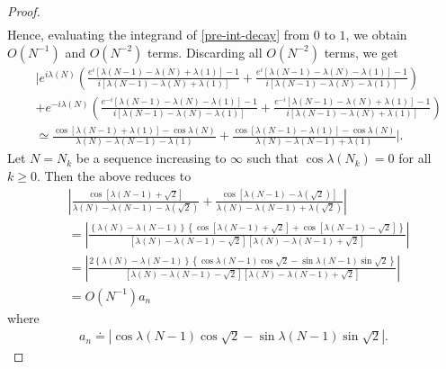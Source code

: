 \documentclass[12pt,reqno]{amsart}
\numberwithin{equation}{section}  %
\begin{document}
\begin{proof}
\begin{equation*}
\begin{split}
\end{split}
\end{equation*}
%
%
Hence, evaluating the integrand of \eqref{pre-int-decay} from $0$ to $1$, we obtain $O(N^{-1})$ and $O(N^{-2})$ terms. Discarding all $O(N^{-2})$ terms, we get
%
%
\begin{equation*}
\begin{split}
  & | e^{i \lambda(N)}\left( \frac{e^{i}[\lambda(N-1) - \lambda(N) + \lambda(1)] - 1}{i[\lambda(N-1) - \lambda(N) + \lambda(1)]} + 
  \frac{e^{i}[\lambda(N-1) - \lambda(N) - \lambda(1)] - 1}{i[\lambda(N-1) - \lambda(N) - \lambda(1)]} \right)
  \\
  & + e^{-i \lambda(N)}\left( \frac{e^{-i}[\lambda(N-1) - \lambda(N) - \lambda(1)] - 1}{i[\lambda(N-1) - \lambda(N) - \lambda(1)]} + 
  \frac{e^{-i}[\lambda(N-1) - \lambda(N) + \lambda(1)] - 1}{i[\lambda(N-1) - \lambda(N) + \lambda(1)]} \right)
  \\
  & \simeq \frac{\cos[\lambda(N-1) + \lambda(1)] - \cos \lambda(N)}{\lambda(N) - \lambda(N-1) - \lambda(1)} + \frac{\cos[\lambda(N-1) - \lambda(1)] - \cos \lambda(N)}{\lambda(N) - \lambda(N-1) + \lambda(1)} |. 
\end{split}
\end{equation*}
%
%
Let $N = N_{k}$ be a sequence increasing to $\infty$ such that $\cos \lambda(N_{k}) = 0$ for all $k \ge 0$. Then the above reduces to 
%
%
%
%
\begin{equation}
  \label{puy}
\begin{split}
  & | \frac{\cos[\lambda(N-1) + \sqrt{2}] }{\lambda(N) - \lambda(N-1) - \lambda(\sqrt{2})} + \frac{\cos[\lambda(N-1) - \lambda(\sqrt{2})] }{\lambda(N) - \lambda(N-1) + \lambda(\sqrt{2})} |
  \\
  & = | \frac{\left \{ \lambda(N) - \lambda(N-1) \right \}\left \{ \cos[\lambda(N-1) + \sqrt{2}] + \cos\left[ \lambda(N-1) - \sqrt{2} \right] \right \}}{[\lambda(N) - \lambda(N-1) - \sqrt{2}][\lambda(N) - \lambda(N-1) + \sqrt{2}]} |
  \\
  & = | \frac{2 \left \{ \lambda(N) - \lambda(N-1) \right \}\left \{ \cos\lambda(N-1) \cos \sqrt{2} - \sin\lambda(N-1) \sin \sqrt{2} \right \}}{[\lambda(N) - \lambda(N-1) - \sqrt{2}][\lambda(N) - \lambda(N-1) + \sqrt{2}]} |
  \\
  & = O(N^{-1})a_{n}
\end{split}
\end{equation}
%
%
where
%
%
\begin{equation*}
\begin{split}
  a_{n} \doteq | \cos\lambda(N-1) \cos \sqrt{2} - \sin\lambda(N-1) \sin \sqrt{2} |.

\end{split}
\end{equation*}
\end{proof}
\end{document}
